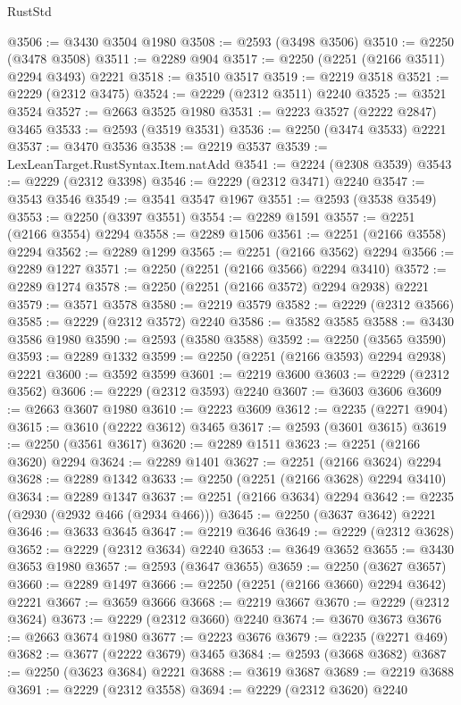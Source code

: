 \begin{lexlean}{RustStd}
\begin{coremodule}
@3506 := @3430 @3504 @1980
@3508 := @2593 (@3498 @3506)
@3510 := @2250 (@3478 @3508)
@3511 := @2289 @904
@3517 := @2250 (@2251 (@2166 @3511) @2294 @3493) @2221
@3518 := @3510 @3517
@3519 := @2219 @3518
@3521 := @2229 (@2312 @3475)
@3524 := @2229 (@2312 @3511) @2240
@3525 := @3521 @3524
@3527 := @2663 @3525 @1980
@3531 := @2223 @3527 (@2222 @2847) @3465
@3533 := @2593 (@3519 @3531)
@3536 := @2250 (@3474 @3533) @2221
@3537 := @3470 @3536
@3538 := @2219 @3537
@3539 := LexLeanTarget.RustSyntax.Item.natAdd
@3541 := @2224 (@2308 @3539)
@3543 := @2229 (@2312 @3398)
@3546 := @2229 (@2312 @3471) @2240
@3547 := @3543 @3546
@3549 := @3541 @3547 @1967
@3551 := @2593 (@3538 @3549)
@3553 := @2250 (@3397 @3551)
@3554 := @2289 @1591
@3557 := @2251 (@2166 @3554) @2294
@3558 := @2289 @1506
@3561 := @2251 (@2166 @3558) @2294
@3562 := @2289 @1299
@3565 := @2251 (@2166 @3562) @2294
@3566 := @2289 @1227
@3571 := @2250 (@2251 (@2166 @3566) @2294 @3410)
@3572 := @2289 @1274
@3578 := @2250 (@2251 (@2166 @3572) @2294 @2938) @2221
@3579 := @3571 @3578
@3580 := @2219 @3579
@3582 := @2229 (@2312 @3566)
@3585 := @2229 (@2312 @3572) @2240
@3586 := @3582 @3585
@3588 := @3430 @3586 @1980
@3590 := @2593 (@3580 @3588)
@3592 := @2250 (@3565 @3590)
@3593 := @2289 @1332
@3599 := @2250 (@2251 (@2166 @3593) @2294 @2938) @2221
@3600 := @3592 @3599
@3601 := @2219 @3600
@3603 := @2229 (@2312 @3562)
@3606 := @2229 (@2312 @3593) @2240
@3607 := @3603 @3606
@3609 := @2663 @3607 @1980
@3610 := @2223 @3609
@3612 := @2235 (@2271 @904)
@3615 := @3610 (@2222 @3612) @3465
@3617 := @2593 (@3601 @3615)
@3619 := @2250 (@3561 @3617)
@3620 := @2289 @1511
@3623 := @2251 (@2166 @3620) @2294
@3624 := @2289 @1401
@3627 := @2251 (@2166 @3624) @2294
@3628 := @2289 @1342
@3633 := @2250 (@2251 (@2166 @3628) @2294 @3410)
@3634 := @2289 @1347
@3637 := @2251 (@2166 @3634) @2294
@3642 := @2235 (@2930 (@2932 @466 (@2934 @466)))
@3645 := @2250 (@3637 @3642) @2221
@3646 := @3633 @3645
@3647 := @2219 @3646
@3649 := @2229 (@2312 @3628)
@3652 := @2229 (@2312 @3634) @2240
@3653 := @3649 @3652
@3655 := @3430 @3653 @1980
@3657 := @2593 (@3647 @3655)
@3659 := @2250 (@3627 @3657)
@3660 := @2289 @1497
@3666 := @2250 (@2251 (@2166 @3660) @2294 @3642) @2221
@3667 := @3659 @3666
@3668 := @2219 @3667
@3670 := @2229 (@2312 @3624)
@3673 := @2229 (@2312 @3660) @2240
@3674 := @3670 @3673
@3676 := @2663 @3674 @1980
@3677 := @2223 @3676
@3679 := @2235 (@2271 @469)
@3682 := @3677 (@2222 @3679) @3465
@3684 := @2593 (@3668 @3682)
@3687 := @2250 (@3623 @3684) @2221
@3688 := @3619 @3687
@3689 := @2219 @3688
@3691 := @2229 (@2312 @3558)
@3694 := @2229 (@2312 @3620) @2240

\end{coremodule}
\end{lexlean}
